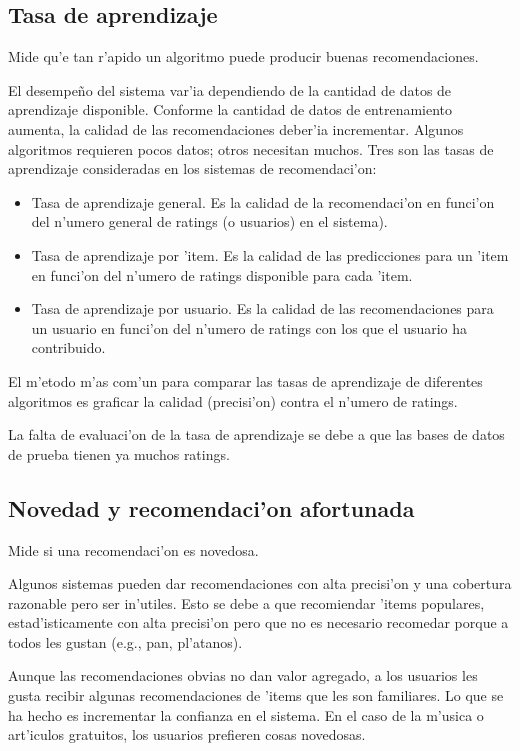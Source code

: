 \documentclass[11pt]{article}
\begin{document}

\subsection{Tasa de aprendizaje}
Mide qu'e tan r'apido un algoritmo puede producir buenas recomendaciones.

El desempe\~{n}o del sistema var'ia dependiendo de la cantidad de datos de aprendizaje disponible. Conforme la cantidad de datos de entrenamiento aumenta, la calidad de las recomendaciones deber'ia incrementar. Algunos algoritmos requieren pocos datos; otros necesitan muchos. Tres son las tasas de aprendizaje consideradas en los sistemas de recomendaci'on:

\begin{itemize}
\item Tasa de aprendizaje general. Es la calidad de la recomendaci'on en funci'on del n'umero general de ratings (o usuarios) en el sistema).
\item Tasa de aprendizaje por 'item. Es la calidad de las predicciones para un 'item en funci'on del n'umero de ratings disponible para cada 'item.
\item Tasa de aprendizaje por usuario. Es la calidad de las recomendaciones para un usuario en funci'on del n'umero de ratings con los que el usuario ha contribuido.
\end{itemize}

El m'etodo m'as com'un para comparar las tasas de aprendizaje de diferentes algoritmos es graficar la calidad (precisi'on) contra el n'umero de ratings.

La falta de evaluaci'on de la tasa de aprendizaje se debe a que las bases de datos de prueba tienen ya muchos ratings.

\subsection{Novedad y recomendaci'on afortunada}
Mide si una recomendaci'on es novedosa.

Algunos sistemas pueden dar recomendaciones con alta precisi'on y una cobertura razonable pero ser in'utiles. Esto se debe a que recomiendar 'items populares, estad'isticamente con alta precisi'on pero que no es necesario recomedar porque a todos les gustan (e.g., pan, pl'atanos). 

Aunque las recomendaciones obvias no dan valor agregado, a los usuarios les gusta recibir algunas recomendaciones de 'items que les son familiares. Lo que se ha hecho es incrementar la confianza en el sistema. En el caso de la m'usica o art'iculos gratuitos, los usuarios prefieren cosas novedosas. 
\end{document}
